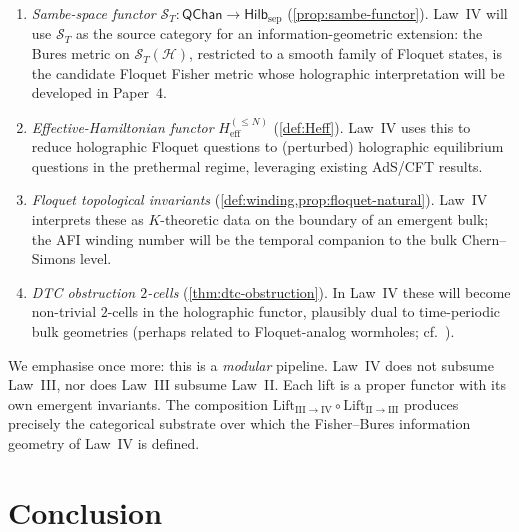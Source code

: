 \documentclass[12pt]{article}
\theoremstyle{definition}
\theoremstyle{remark}
\newcommand{\Hcal}{\mathcal{H}}
\newcommand{\Heff}{H_{\mathrm{eff}}}
\newcommand{\QChan}{\mathsf{QChan}}
\newcommand{\Hilb}{\mathsf{Hilb}}
\begin{document}
\begin{enumerate}
\item \emph{Sambe-space functor} $\mathcal{S}_T\colon\QChan\to\Hilb_{\mathrm{sep}}$ (\cref{prop:sambe-functor}). Law~IV will use $\mathcal{S}_T$ as the source category for an information-geometric extension: the Bures metric on $\mathcal{S}_T(\Hcal)$, restricted to a smooth family of Floquet states, is the candidate Floquet Fisher metric whose holographic interpretation will be developed in Paper~4.
\item \emph{Effective-Hamiltonian functor} $\Heff^{(\leq N)}$ (\cref{def:Heff}). Law~IV uses this to reduce holographic Floquet questions to (perturbed) holographic equilibrium questions in the prethermal regime, leveraging existing AdS/CFT results.
\item \emph{Floquet topological invariants} (\cref{def:winding,prop:floquet-natural}). Law~IV interprets these as $K$-theoretic data on the boundary of an emergent bulk; the AFI winding number will be the temporal companion to the bulk Chern--Simons level.
\item \emph{DTC obstruction $2$-cells} (\cref{thm:dtc-obstruction}). In Law~IV these will become non-trivial $2$-cells in the holographic functor, plausibly dual to time-periodic bulk geometries (perhaps related to Floquet-analog wormholes; cf.~\cite{anous2020}).
\end{enumerate}

We emphasise once more: this is a \emph{modular} pipeline. Law~IV does not subsume Law~III, nor does Law~III subsume Law~II. Each lift is a proper functor with its own emergent invariants. The composition $\mathrm{Lift}_{\mathrm{III}\to\mathrm{IV}}\circ\mathrm{Lift}_{\mathrm{II}\to\mathrm{III}}$ produces precisely the categorical substrate over which the Fisher--Bures information geometry of Law~IV is defined.

\section{Conclusion}
\label{sec:conclusion}
\end{document}
